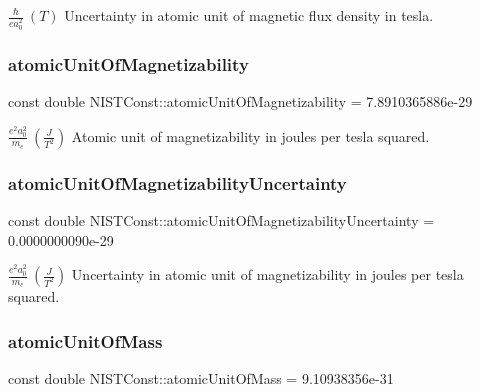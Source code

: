 $\frac{\hbar}{e a_0^2} \ (T)$ Uncertainty in atomic unit of magnetic flux density in tesla. \mbox{\label{group___n_i_s_t_const-_atomic_unit_ga9c2b29b9a46e8dfd78837ef0c8a16bec}} 
\subsubsection{\texorpdfstring{atomic\+Unit\+Of\+Magnetizability}{atomicUnitOfMagnetizability}}
{\footnotesize\ttfamily const double N\+I\+S\+T\+Const\+::atomic\+Unit\+Of\+Magnetizability = 7.\+8910365886e-\/29}

$\frac{e^2a_0^2}{m_e} \ (\frac{J}{T^2})$ Atomic unit of magnetizability in joules per tesla squared. \mbox{\label{group___n_i_s_t_const-_atomic_unit_ga660abcd5b236c672a4f71398bc4894b6}} 
\subsubsection{\texorpdfstring{atomic\+Unit\+Of\+Magnetizability\+Uncertainty}{atomicUnitOfMagnetizabilityUncertainty}}
{\footnotesize\ttfamily const double N\+I\+S\+T\+Const\+::atomic\+Unit\+Of\+Magnetizability\+Uncertainty = 0.\+0000000090e-\/29}

$\frac{e^2a_0^2}{m_e} \ (\frac{J}{T^2})$ Uncertainty in atomic unit of magnetizability in joules per tesla squared. \mbox{\label{group___n_i_s_t_const-_atomic_unit_ga61a2da51489f7bb8965e9e4747db34a7}} 
\subsubsection{\texorpdfstring{atomic\+Unit\+Of\+Mass}{atomicUnitOfMass}}
{\footnotesize\ttfamily const double N\+I\+S\+T\+Const\+::atomic\+Unit\+Of\+Mass = 9.\+10938356e-\/31}

